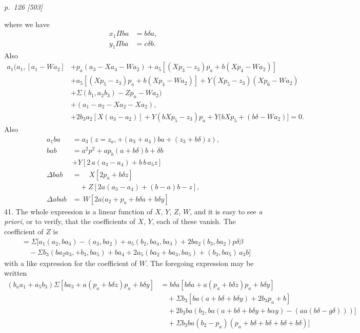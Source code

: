 \documentclass[11pt,a4paper]{book}
\begin{document}
\clearpage

\bigskip
\textit{p.~126 [503]}
\smallskip

\noindent
where we have
\begin{align*}
x_1\Pi b a & = b\delta a, \\
y_1\Pi b a & = c\delta b.
\end{align*}
Also
\begin{align*}
a_1 (a_1, [a_1 - W a_2] & + p_a (a_3 - X a_4 - W a_2) + a_5 [(X p_3 - z_3) p_a + b(X p_4 - W a_2)]\\
& + a_5 [(X p_5 - z_3) p_a + b(X p_4 - W a_2)] + Y(X p_5 - z_3)(X p_6 - W a_2)\\
& + \Sigma(b_1, a_2 b_3) - Z p_a - W a_2) \\
& + (a_1 - a_2 - X a_2 - X a_2),\\
& + 2 b_3 a_2 [X(a_3 - a_2)] + Y(b X p_5 - z_3) p_a + Y(b X p_5 + (b\delta - W a_2)] = 0.
\end{align*}
Also
\begin{align*}
a_1 b a & = a_3 (z = z_a, + (a_3 + a_4) b a + (z_3 + b\delta) z), \\
b a b & = a^2 p^2 + a p_b (a + b\delta) b + \delta b\\
& + Y[2\,a (a_3 - a_4) + b\,b\,a_5 z] \\
\Delta b a b & = \quad X[2 p_a + b\delta z] \\
& \quad + Z[2 a (a_3 - a_4) + (b - a) b - z],\\
\Delta a b a b & = \,W [2 a (a_2 + p_a + b\delta a + b\delta y]
\end{align*}
41. The whole expression is a linear function of $X$, $Y$, $Z$, $W$, and it is easy to
see \textit{a priori}, or to verify, that the coefficients of $X$, $Y$, each of these vanish. The
coefficient of $Z$ is
\begin{align*}
& = \Sigma [a_1 (a_2, b a_3) - (a_3, b a_2) + a_5 (b_2, b a_4, b a_3) + 2 b a_2 (b_3, b a_2) p\delta\beta\\
& \quad - \Sigma b_3 (b a_2 a_3, + b_3, b a_5) + b a_4 + 2 a_5 (b a_2 + b a_3, b a_5) + (b_3, b a_5)\,a_3 b]
\end{align*}
with a like expression for the coefficient of $W$.
The foregoing expression may be written
\begin{align*}
(b_a a_1 + a_5 b_3)\Sigma [b a_3 + a (p_a + b\delta z) p_a + b\delta y] & = b\delta a [b\delta a + a (p_a + b\delta z) p_a + b\delta y]\\
& \quad + \Sigma b_3 [b a (a + b\delta + b\delta y) + 2 b_3 p_a + b]\\
& \quad + 2 b_3 b a (b_2, b a (a + b\delta + b\delta y + b \alpha y) - (a a (b\delta - g\delta)))]\\
& \quad + \Sigma b_3 b a (b_2 - p_a) (p_a + b\delta + b\delta + b\delta + b \delta)]
\end{align*}
\end{document}
